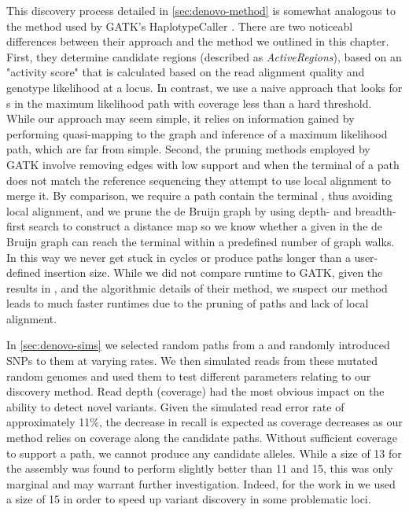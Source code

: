 This \denovo{} discovery process detailed in \autoref{sec:denovo-method} is somewhat analogous to the method used by GATK's HaplotypeCaller \cite{Poplin2018}. There are two noticeabl differences between their approach and the method we outlined in this chapter. First, they determine candidate regions (described as \emph{ActiveRegions}), based on an "activity score" that is calculated based on the read alignment quality and genotype likelihood at a locus. In contrast, we use a naive approach that looks for \kmer{}s in the maximum likelihood path with coverage less than a hard threshold. While our approach may seem simple, it relies on information gained by performing quasi-mapping to the graph and inference of a maximum likelihood path, which are far from simple. Second, the pruning methods employed by GATK involve removing edges with low support and when the terminal \kmer{} of a path does not match the reference sequencing they attempt to use local alignment to merge it. By comparison, we require a path contain the terminal \kmer{}, thus avoiding local alignment, and we prune the de Bruijn graph by using depth- and breadth-first search to construct a distance map so we know whether a given \kmer{} in the de Bruijn graph can reach the terminal \kmer{} within a predefined number of graph walks. In this way we never get stuck in cycles or produce paths longer than a user-defined insertion size. While we did not compare \pandora{} runtime to GATK, given the results in \cite{Poplin2018}, and the algorithmic details of their method, we suspect our method leads to much faster runtimes due to the pruning of paths and lack of local alignment.

In \autoref{sec:denovo-sims} we selected random paths from a \panrg{} and randomly introduced SNPs to them at varying rates. We then simulated \ont{} reads from these mutated random genomes and used them to test different parameters relating to our \denovo{} discovery method. Read depth (coverage) had the most obvious impact on the ability to detect novel variants. Given the simulated \ont{} read error rate of approximately 11\%, the decrease in recall is expected as coverage decreases as our method relies on \kmer{} coverage along the candidate paths. Without sufficient \kmer{} coverage to support a path, we cannot produce any candidate alleles. While a \kmer{} size of 13 for the \denovo{} assembly was found to perform slightly better than 11 and 15, this was only marginal and may warrant further investigation. Indeed, for the work in \cite{pandora} we used a \denovo{} \kmer{} size of 15 in order to speed up variant discovery in some problematic loci.

